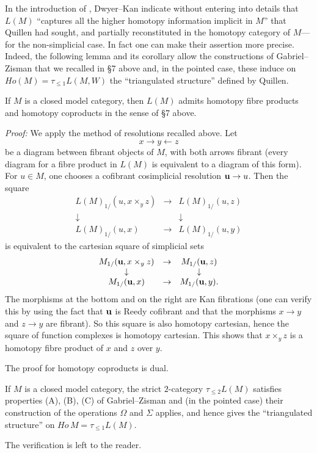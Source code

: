 In the introduction of \cite{DwyerKan3}, Dwyer--Kan indicate without
entering into details that $L(M)$ ``captures all the higher homotopy
information implicit in $M$'' that Quillen \cite{Quillen} had
sought, and partially reconstituted in the homotopy category of
$M$---for the non-simplicial case. In fact one can make their assertion more
precise.
Indeed, the following lemma and its corollary allow
the constructions of Gabriel--Zisman that we recalled in \S 7 above
and, in the pointed case, these induce on
$Ho(M)=\tau _{\leq 1}
L(M,W)$
the ``triangulated structure'' defined by Quillen.


\begin{lemma}
\label{prodfibhom}
If $M$ is a closed model category, then $L(M)$ admits
homotopy fibre products and homotopy coproducts in the sense of \S 7
above.
\end{lemma}
{\em Proof:}
We apply the method of resolutions recalled
above. Let
$$
x\rightarrow y\leftarrow z
$$
be a diagram between fibrant objects of $M$, with both arrows fibrant
(every diagram for a fibre product in $L(M)$ is equivalent to a
diagram of this form). For $u\in M$, one chooses a cofibrant
cosimplicial resolution ${\bf u}\rightarrow u$. Then the square
$$
\begin{array}{ccc}
L(M)_{1/}(u, x\times _yz)& \rightarrow & L(M)_{1/}(u, z)\\
\downarrow && \downarrow \\
L(M)_{1/}(u, x)& \rightarrow & L(M)_{1/}(u, y)
\end{array}
$$
is equivalent to the
cartesian square of simplicial sets
$$
\begin{array}{ccc}
M_{1/}({\bf u}, x\times _yz)& \rightarrow & M_{1/}({\bf u}, z)\\
\downarrow && \downarrow \\
M_{1/}({\bf u}, x)& \rightarrow & M_{1/}({\bf u}, y) .
\end{array}
$$
The morphisms at the bottom and on the right are Kan fibrations
(one can verify this by using the fact that ${\bf u}$ is Reedy cofibrant
and that the morphisms $x\rightarrow y$
and $z\rightarrow y$ are fibrant). So this square is also
homotopy cartesian, hence the square of function complexes is
homotopy cartesian. This shows that $x\times_yz$ is a homotopy fibre
product of $x$ and $z$ over $y$.

The proof for homotopy coproducts is dual.
\eop

\begin{corollary}
\label{gzpourM}
If $M$ is a closed model category,
the strict $2$-category $\tau _{\leq 2} L(M)$ satisfies
properties (A), (B), (C) of Gabriel--Zisman and (in the pointed case) their
construction of the operations $\Omega$ and $\Sigma$
applies, and hence gives the ``triangulated structure'' on $Ho\, M=\tau _{\leq
1} L(M)$.
\end{corollary}
The verification is left to the reader.
\eop


